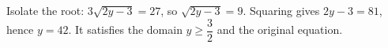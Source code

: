Isolate the root: $3\sqrt{2y-3}=27$, so $\sqrt{2y-3}=9$. Squaring gives $2y-3=81$, hence $\boxed{y=42}$. It satisfies the domain $y\ge\dfrac{3}{2}$ and the original equation.
